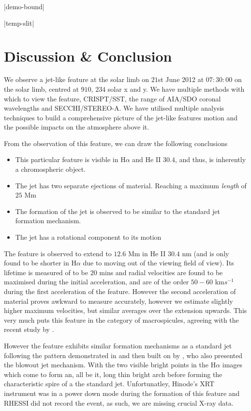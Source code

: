 \documentclass{emulateapj}
\begin{document}
|demo-bound|

|temp-slit|

\section{Discussion \& Conclusion}

We observe a jet-like feature at the solar limb on $21$st June 2012 at $07:30:00$ on the solar limb, centred at $910$, $234$ solar x and y.
We have multiple methods with which to view the feature, CRISPT/SST, the range of AIA/SDO coronal wavelengths and SECCHI/STEREO-A.
We have utilised multiple analysis techniques to build a comprehensive picture of the jet-like features motion and the possible impacts on the atmosphere above it.

From the observation of this feature, we can draw the following conclusions
\begin{itemize}
	\item{This particular feature is visible in H$\alpha$ and He II $30.4$, and thus, is inherently a chromospheric object.}
	\item{The jet has two separate ejections of material. Reaching a maximum \emph{length} of $25$ Mm}
	\item{The formation of the jet is observed to be similar to the standard jet formation mechanism.}
	\item{The jet has a rotational component to its motion}
\end{itemize}

The feature is observed to extend to $12.6$ Mm in He II $30.4$ nm (and is only found to be shorter in H$\alpha$ due to moving out of the viewing field of view).
Its lifetime is measured of to be $20$ mins and radial velocities are found to be maximised during the initial acceleration, and are of the order $50 - 60$ km$s^{-1}$ during the first acceleration of the feature.
However the second acceleration of material proves awkward to measure accurately, however we estimate slightly higher maximum velocities, but similar averages over the extension upwards. 
This very much puts this feature in the category of macrospicules, agreeing with the recent study by \cite{Bennett2015}.

However the feature exhibits similar formation mechanisms as a standard jet following the pattern demonstrated in \cite{Shibata1992} and then built on by \cite{Moore2010}, who also presented the blowout jet mechanism.
With the two visible bright points in the H$\alpha$ images which come to form an, all be it, long thin bright arch before forming the characteristic spire of a the standard jet.
Unfortunatley, Hinode's XRT instrument was in a power down mode during the formation of this feature and RHESSI did not record the event, as such, we are missing crucial X-ray data.
\end{document}
